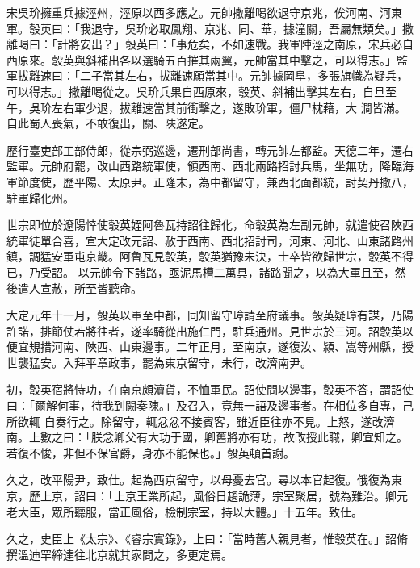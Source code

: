 \begin{pinyinscope}
 宋吳玠擁重兵據涇州，涇原以西多應之。元帥撒離喝欲退守京兆，俟河南、河東軍。彀英曰：「我退守，吳玠必取鳳翔、京兆、同、華，據潼關，吾屬無類矣。」撒離喝曰：「計將安出？」彀英曰：「事危矣，不如速戰。我軍陣涇之南原，宋兵必自西原來。彀英與斜補出各以選騎五百摧其兩翼，元帥當其中擊之，可以得志。」監軍拔離速曰：「二子當其左右，拔離速願當其中。元帥據岡阜，多張旗幟為疑兵，可以得志。」撒離喝從之。吳玠兵果自西原來，彀英、斜補出擊其左右，自旦至午，吳玠左右軍少退，拔離速當其前衝擊之，遂敗玠軍，僵尸枕藉，大
 澗皆滿。自此蜀人喪氣，不敢復出，關、陜遂定。



 歷行臺吏部工部侍郎，從宗弼巡邊，遷刑部尚書，轉元帥左都監。天德二年，遷右監軍。元帥府罷，改山西路統軍使，領西南、西北兩路招討兵馬，坐無功，降臨海軍節度使，歷平陽、太原尹。正隆末，為中都留守，兼西北面都統，討契丹撒八，駐軍歸化州。



 世宗即位於遼陽悻使彀英姪阿魯瓦持詔往歸化，命彀英為左副元帥，就遣使召陜西統軍徒單合喜，宣大定改元詔、赦于西南、西北招討司，河東、河北、山東諸路州鎮，調猛安軍屯京畿。阿魯瓦見彀英，彀英猶豫未決，士卒皆欲歸世宗，彀英不得已，乃受詔。
 以元帥令下諸路，亟泥馬槽二萬具，諸路聞之，以為大軍且至，然後遣人宣赦，所至皆聽命。



 大定元年十一月，彀英以軍至中都，同知留守璋請至府議事。彀英疑璋有謀，乃陽許諾，排節仗若將往者，遂率騎從出施仁門，駐兵通州。見世宗於三河。詔彀英以便宜規措河南、陜西、山東邊事。二年正月，至南京，遂復汝、潁、嵩等州縣，授世襲猛安。入拜平章政事，罷為東京留守，未行，改濟南尹。



 初，彀英宿將恃功，在南京頗瀆貨，不恤軍民。詔使問以邊事，彀英不答，謂詔使曰：「爾解何事，待我到闕奏陳。」及召入，竟無一語及邊事者。在相位多自專，己所欲輒
 自奏行之。除留守，輒忿忿不接賓客，雖近臣往亦不見。上怒，遂改濟南。上數之曰：「朕念卿父有大功于國，卿舊將亦有功，故改授此職，卿宜知之。若復不悛，非但不保官爵，身亦不能保也。」彀英頓首謝。



 久之，改平陽尹，致仕。起為西京留守，以母憂去官。尋以本官起復。俄復為東京，歷上京，詔曰：「上京王業所起，風俗日趨詭薄，宗室聚居，號為難治。卿元老大臣，眾所聽服，當正風俗，檢制宗室，持以大體。」十五年。致仕。



 久之，史臣上《太宗》、《睿宗實錄》，上曰：「當時舊人親見者，惟彀英在。」詔脩撰溫迪罕締達往北京就其家問之，多更定焉。




\end{pinyinscope}
